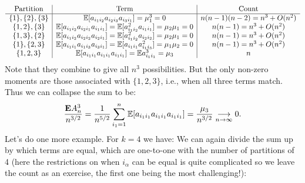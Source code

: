 \[
\begin{array}{c | c | c}
\hbox{Partition} & \hbox{Term} & \hbox{Count} \\
\hline
  \{1\}, \{2\}, \{3\}  & {\mathbb E}[a_{i_1 i_2} a_{i_2i_3} a_{i_3i_1}] = \mu_1^3  = 0   &  n (n-1)(n-2) = n^3 + O(n^2) \\
  \{1,2\}, \{3\}  & {\mathbb E}[a_{i_1i_2} a_{i_2i_1} a_{i_1i_1}] = {\mathbb E}[a_{i_1i_2}^2 a_{i_1i_1}] = \mu_2 \mu_1 = 0  &  n (n-1)= n^3 + O(n^2) \\
  \{1,3\}, \{2\}  & {\mathbb E}[a_{i_1i_2} a_{i_2i_2} a_{i_2i_1}] = {\mathbb E}[a_{i_1i_2}^2 a_{i_2i_2}] = \mu_2 \mu_1 = 0 &  n (n-1)= n^3 + O(n^2)  \\
  \{1\},  \{2,3\}  & {\mathbb E}[a_{i_1i_1} a_{i_1i_3} a_{i_3i_1}]  = {\mathbb E}[a_{i_1i_1} a_{i_1i_3}^2]  = \mu_1 \mu_2 = 0 &  n (n-1)= n^3 + O(n^2)  \\
 \{1,2,3\} & {\mathbb E}[a_{i_1i_1} a_{i_1i_1} a_{i_1i_1}] = {\mathbb E} a_{i_1i_1}^3 = \mu_3&  n
\end{array}
\]
Note that they combine to give all $n^3$ possibilities. But the only non-zero moments are those associated with $\{1,2,3\}$, i.e., when all three terms match. Thus we can collapse the sum to be:
\[
{\bm{\mathrm{E}}A_n^3 \over n^{3/2}} = {1 \over n^{5/2}} \sum_{i_1=1}^n {\mathbb E}[a_{i_1i_1} a_{i_1i_1} a_{i_1i_1}] = {\mu_3 \over n^{3/2}}  \underset{n \rightarrow \infty}{\longrightarrow}  0.
\]
Let's do one more example. For $k = 4$ we have:
We can again divide the sum up by which terms are equal, which are one-to-one with the number of partitions of 4 (here the restrictions on when $i_\ensuremath{\alpha}$ can be equal is quite complicated so we leave the count as an exercise, the first one being the most challenging!):
